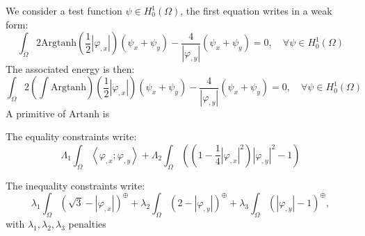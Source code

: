 We consider a test function $\psi \in H^1_0(\Omega)$, the first equation writes in a weak form:
\begin{equation}
\label{eq:weak form}
\int_{\Omega} 2\mathrm{Argtanh}(\frac12 |\varphi_{,x}|)(\psi_x + \psi_y) - \frac{4}{|\varphi_{,y}|}(\psi_x + \psi_y) = 0, \quad \forall \psi \in H^1_0(\Omega)
\end{equation}
The associated energy is then: 
\begin{equation}
\label{eq:energy}
\int_{\Omega} 2\left( \int \mathrm{Argtanh} \right)(\frac12 |\varphi_{,x}|)(\psi_x + \psi_y) - \frac{4}{|\varphi_{,y}|}(\psi_x + \psi_y) = 0, \quad \forall \psi \in H^1_0(\Omega)
\end{equation}
A primitive of $\mathrm{Artanh}$ is 

The equality constraints write:
\begin{equation}
\Lambda_1 \int_{\Omega} \left\langle \varphi_{,x} ; \varphi_{,y} \right\rangle + \Lambda_2 \int_{\Omega} \left( (1 - \frac14 |\varphi_{,x}|^2) |\varphi_{,y}|^2 - 1 \right)
\end{equation}

The inequality constraints write:
\begin{equation}
\label{eq:inequality constraints energy}
\lambda_1 \int_{\Omega} \left(\sqrt{3} - |\varphi_{,x}| \right)^\oplus + \lambda_2 \int_{\Omega} \left(2 - |\varphi_{,y}| \right)^\oplus + \lambda_3 \int_{\Omega} \left(|\varphi_{,y}| - 1 \right)^\oplus,
\end{equation}
with $\lambda_1,\lambda_2,\lambda_3$ penalties 







